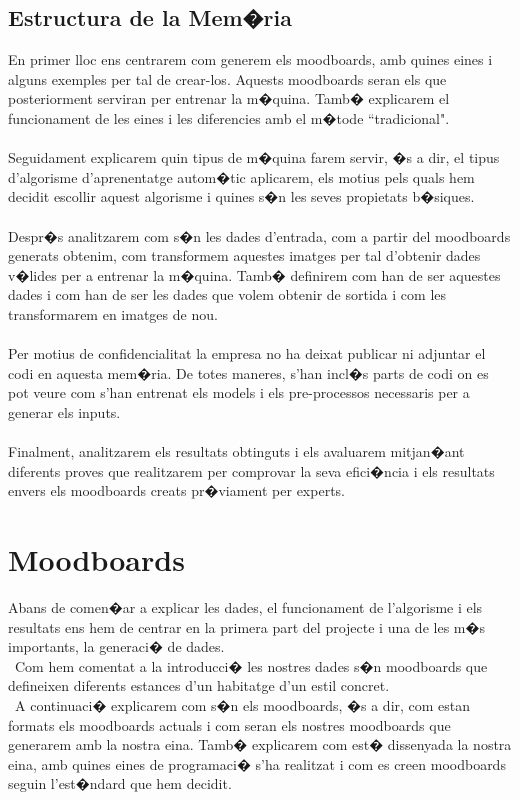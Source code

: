 \documentclass[12pt,a4paper,openright,oneside]{article}
\numberwithin{equation}{section}
\theoremstyle{definition}
\begin{document}
\subsection*{Estructura de la Mem�ria}
En primer lloc ens centrarem com generem els moodboards, amb quines eines i alguns exemples per tal de crear-los. Aquests moodboards seran els que posteriorment serviran per entrenar la m�quina. Tamb� explicarem el funcionament de les eines i les diferencies amb el m�tode ``tradicional".\\\\
Seguidament explicarem quin tipus de m�quina farem servir, �s a dir, el tipus d'algorisme d'aprenentatge autom�tic  aplicarem, els motius pels quals hem decidit escollir aquest algorisme i quines s�n les seves propietats b�siques.\\\\
Despr�s analitzarem com s�n les dades d'entrada, com a partir del moodboards generats obtenim, com transformem aquestes imatges per tal d'obtenir dades v�lides per a entrenar la m�quina. Tamb� definirem com han de ser aquestes dades i com han de ser les dades que volem obtenir de sortida i com les transformarem en imatges de nou. \\\\
Per motius de confidencialitat la empresa no ha deixat publicar ni adjuntar el codi en aquesta mem�ria. De totes maneres, s'han incl�s parts de codi on es pot veure com s'han entrenat els models i els pre-processos necessaris per a generar els inputs. \\\\
Finalment, analitzarem els resultats obtinguts i els avaluarem mitjan�ant diferents proves que realitzarem per comprovar la seva efici�ncia i els resultats envers els moodboards creats pr�viament per experts.
\newpage

\section{Moodboards}

Abans de comen�ar a explicar les dades, el funcionament de l'algorisme i els resultats ens hem de centrar en la primera part del projecte i una de les m�s importants, la generaci� de dades.\\\
Com hem comentat a la introducci� les nostres dades s�n moodboards que defineixen diferents estances d'un habitatge d'un estil concret. \\\
A continuaci� explicarem com s�n els moodboards, �s a dir, com estan formats els moodboards actuals i com seran els nostres moodboards que generarem amb la nostra eina. Tamb� explicarem com est� dissenyada la nostra eina, amb quines eines de programaci� s'ha realitzat i com es creen moodboards seguin l'est�ndard que hem decidit.
\end{document}
